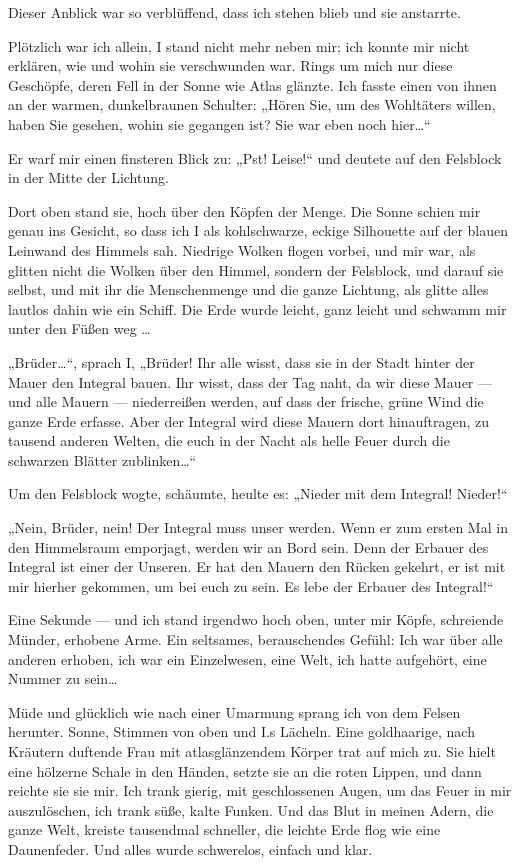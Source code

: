 Dieser Anblick war so verblüffend, dass ich stehen blieb und sie
anstarrte.

Plötzlich war ich allein, I stand nicht mehr neben mir;
ich
konnte mir nicht erklären, wie und wohin sie verschwunden war.
Rings um mich nur diese Geschöpfe, deren Fell in der Sonne wie
Atlas glänzte. Ich fasste einen von ihnen an der warmen,
dunkelbraunen Schulter: „Hören Sie, um des Wohltäters willen, haben
Sie gesehen, wohin sie gegangen ist? Sie war eben noch hier\ldots{}“

Er
warf mir einen finsteren Blick zu: „Pst! Leise!“ und deutete auf
den Felsblock in der Mitte der Lichtung.

Dort oben stand sie, hoch
über den Köpfen der Menge. Die Sonne schien mir genau ins Gesicht,
so dass ich I als kohlschwarze, eckige Silhouette auf der blauen
Leinwand des Himmels sah. Niedrige Wolken flogen vorbei, und mir
war, als glitten nicht die Wolken über den Himmel, sondern der
Felsblock, und darauf sie selbst, und mit ihr die Menschenmenge und
die ganze Lichtung, als glitte alles lautlos dahin wie ein Schiff.
Die Erde wurde leicht, ganz leicht und schwamm mir unter den Füßen
weg \ldots{}

„Brüder\ldots{}“, sprach I, „Brüder! Ihr alle wisst, dass sie in
der Stadt hinter der Mauer den Integral bauen. Ihr wisst, dass der
Tag naht, da wir diese Mauer — und alle Mauern — niederreißen
werden, auf dass der frische, grüne Wind die ganze Erde erfasse.
Aber der Integral wird diese Mauern dort hinauftragen, zu tausend
anderen Welten, die euch in der Nacht als helle Feuer durch die
schwarzen Blätter zublinken\ldots{}“

Um den Felsblock wogte, schäumte, heulte es: „Nieder mit dem
Integral! Nieder!“

„Nein, Brüder, nein! Der Integral muss unser werden. Wenn er zum
ersten Mal in den Himmelsraum emporjagt, werden wir an Bord sein.
Denn der Erbauer des Integral ist einer der Unseren. Er hat den
Mauern den Rücken gekehrt, er ist mit mir hierher gekommen, um bei
euch zu sein. Es lebe der Erbauer des Integral!“

Eine Sekunde — und ich stand irgendwo hoch oben, unter mir Köpfe,
schreiende Münder, erhobene Arme. Ein seltsames, berauschendes
Gefühl: Ich war über alle anderen erhoben, ich war ein Einzelwesen,
eine Welt, ich hatte aufgehört, eine Nummer zu sein\ldots{}

Müde und glücklich wie nach einer Umarmung sprang ich von dem
Felsen herunter. Sonne, Stimmen von oben und I.s Lächeln. Eine
goldhaarige, nach Kräutern duftende Frau mit atlasglänzendem Körper
trat auf mich zu. Sie hielt eine hölzerne Schale in den Händen,
setzte sie an die roten Lippen, und dann reichte sie sie mir. Ich
trank gierig, mit geschlossenen Augen, um das Feuer in mir
auszulöschen, ich trank süße, kalte Funken. Und das Blut in meinen
Adern, die ganze Welt, kreiste tausendmal schneller, die leichte
Erde flog wie eine Daunenfeder. Und alles wurde schwerelos, einfach
und klar.

